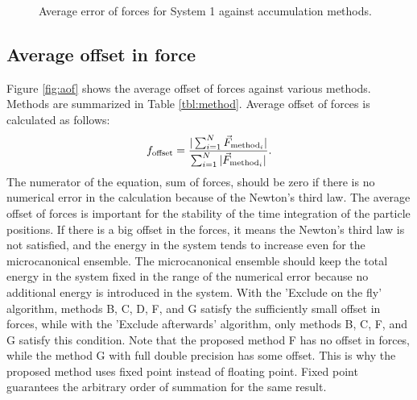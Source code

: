 \begin{figure}
\begin{center}
\vspace*{-2mm}
\caption{Average error of forces for System 1 against accumulation methods.}
\label{fig:aef}
\vspace*{-3mm}
\end{center}
\end{figure}


\subsection{Average offset in force}

Figure \ref{fig:aof} shows the average offset of forces
against various methods. Methods are summarized in Table \ref{tbl:method}.
Average offset of forces is calculated as follows:
\begin{equation}
f_{\rm offset} = \frac{ | \sum_{i=1}^{N} \vec F_{{\rm method}_i} | }
                 { \sum_{i=1}^{N} | \vec F_{{\rm method}_i} | }.
\end{equation}
The numerator of the equation, sum of forces, should be zero if there
is no numerical error in the calculation because of the Newton's third
law.  The average offset of forces is important for the stability of the
time integration of the particle positions. If there is a big offset in
the forces, it means the Newton's third law is not satisfied, and the
energy in the system tends to increase even for the microcanonical
ensemble. The microcanonical ensemble should keep the total energy in
the system fixed in the range of the numerical error because no additional
energy is introduced in the system.  With the 'Exclude on the fly'
algorithm, methods B, C, D, F, and G satisfy the sufficiently small
offset in forces, while with the 'Exclude afterwards' algorithm, only
methods B, C, F, and G satisfy this condition.  
Note that the proposed method F has
no offset in forces, while the method G with full double precision has some
offset.  This is why the proposed method uses fixed point instead of
floating point. Fixed point guarantees the arbitrary order of summation
for the same result.

